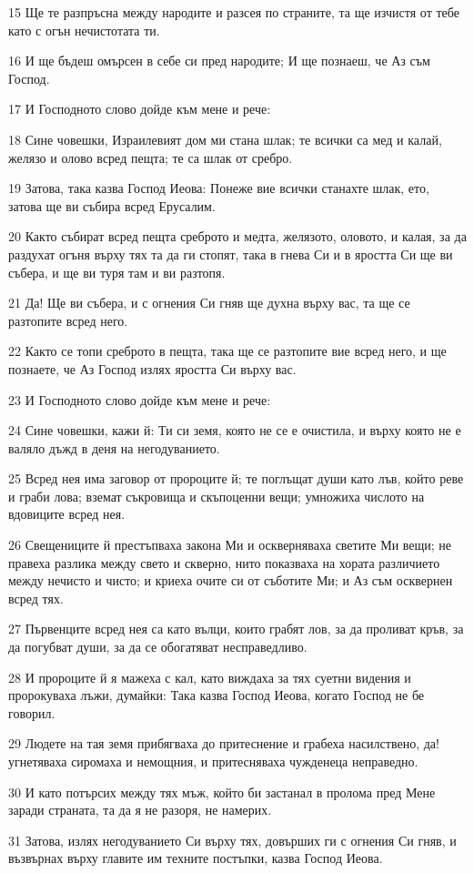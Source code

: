 \par 15 Ще те разпръсна между народите и разсея по страните, та ще изчистя от тебе като с огън нечистотата ти.
\par 16 И ще бъдеш омърсен в себе си пред народите; И ще познаеш, че Аз съм Господ.
\par 17 И Господното слово дойде към мене и рече:
\par 18 Сине човешки, Израилевият дом ми стана шлак; те всички са мед и калай, желязо и олово всред пещта; те са шлак от сребро.
\par 19 Затова, така казва Господ Иеова: Понеже вие всички станахте шлак, ето, затова ще ви събира всред Ерусалим.
\par 20 Както събират всред пещта среброто и медта, желязото, оловото, и калая, за да раздухат огъня върху тях та да ги стопят, така в гнева Си и в яростта Си ще ви събера, и ще ви туря там и ви разтопя.
\par 21 Да! Ще ви събера, и с огнения Си гняв ще духна върху вас, та ще се разтопите всред него.
\par 22 Както се топи среброто в пещта, така ще се разтопите вие всред него, и ще познаете, че Аз Господ излях яростта Си върху вас.
\par 23 И Господното слово дойде към мене и рече:
\par 24 Сине човешки, кажи й: Ти си земя, която не се е очистила, и върху която не е валяло дъжд в деня на негодуванието.
\par 25 Всред нея има заговор от пророците й; те поглъщат души като лъв, който реве и граби лова; вземат съкровища и скъпоценни вещи; умножиха числото на вдовиците всред нея.
\par 26 Свещениците й престъпваха закона Ми и оскверняваха светите Ми вещи; не правеха разлика между свето и скверно, нито показваха на хората различието между нечисто и чисто; и криеха очите си от съботите Ми; и Аз съм осквернен всред тях.
\par 27 Първенците всред нея са като вълци, които грабят лов, за да проливат кръв, за да погубват души, за да се обогатяват несправедливо.
\par 28 И пророците й я мажеха с кал, като виждаха за тях суетни видения и пророкуваха лъжи, думайки: Така казва Господ Иеова, когато Господ не бе говорил.
\par 29 Людете на тая земя прибягваха до притеснение и грабеха насилствено, да! угнетяваха сиромаха и немощния, и притесняваха чужденеца неправедно.
\par 30 И като потърсих между тях мъж, който би застанал в пролома пред Мене заради страната, та да я не разоря, не намерих.
\par 31 Затова, излях негодуванието Си върху тях, довърших ги с огнения Си гняв, и възвърнах върху главите им техните постъпки, казва Господ Иеова.

